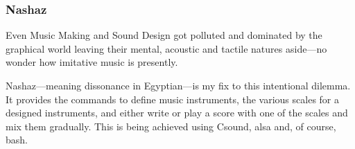 \subsubsection{
Nashaz
}
Even Music Making and Sound Design got polluted and dominated by the graphical 
world leaving their mental, acoustic and tactile natures aside---no wonder how 
imitative music is presently.

Nashaz---meaning dissonance in Egyptian---is my fix to this intentional dilemma.
It provides the commands to define music instruments, the various scales for a 
designed instruments, and either write or play a score with one of the scales 
and mix them gradually.
This is being achieved using Csound, alsa and, of course, bash.
